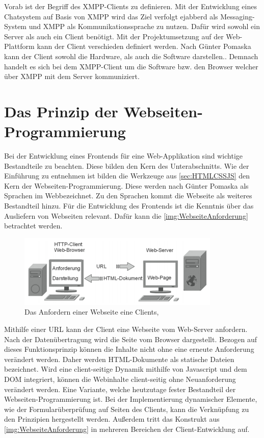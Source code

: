 \documentclass[a4paper,titlepage,halfparskip,12pt]{scrreprt}
\begin{document}
\begin{onehalfspacing}
Vorab ist der Begriff des XMPP-Clients zu definieren. Mit der Entwicklung eines Chatsystem auf Basis von XMPP wird das Ziel verfolgt ejabberd als Messaging-System und XMPP als Kommunikationssprache zu nutzen. Dafür wird sowohl ein Server als auch ein Client benötigt. Mit der Projektumsetzung auf der Web-Plattform kann der Client verschieden definiert werden. Nach Günter Pomaska kann der Client sowohl die Hardware, als auch die Software darstellen.\cite{pomaska2012webseiten}. Demnach handelt es sich bei dem XMPP-Client um die Software bzw. den Browser welcher über XMPP mit dem Server kommuniziert.

\section{Das Prinzip der Webseiten-Programmierung}
\label{WebsiteProgramming}
Bei der Entwicklung eines Frontends für eine Web-Applikation sind wichtige Bestandteile zu beachten. Diese bilden den Kern des Unterabschnitts. Wie der Einführung zu entnehmen ist bilden die Werkzeuge aus \autoref{sec:HTMLCSSJS} den Kern der Webseiten-Programmierung. Diese werden nach Günter Pomaska als \glqq Sprachen im Web\grqq bezeichnet. Zu den Sprachen kommt die Webseite als weiteres Bestandteil hinzu. Für die Entwicklung des Frontends ist die Kenntnis über das Ausliefern von Webseiten relevant. Dafür kann die \autoref{img:WebseiteAnforderung} betrachtet werden.
\begin{figure}[h]
	\centering
	\includegraphics[scale=2.1]{images/WebseiteAnfordern}
	\caption{Das Anfordern einer Webseite eine Clients, \cite{pomaska2012webseiten}}
	\label{img:WebseiteAnforderung}
\end{figure}
Mithilfe einer URL kann der Client eine Webseite vom Web-Server anfordern. Nach der Datenübertragung wird die Seite vom Browser dargestellt. Bezogen auf dieses Funktionsprinzip können die Inhalte nicht ohne eine erneute Anforderung verändert werden. Daher werden HTML-Dokumente als statische Dateien bezeichnet. Wird eine client-seitige Dynamik mithilfe von Javascript und dem \ac{DOM} integriert, können die Webinhalte client-seitig ohne Neuanforderung verändert werden. Eine Variante, welche heutzutage fester Bestandteil der Webseiten-Programmierung ist. \cite{pomaska2012webseiten}
Bei der Implementierung dynamischer Elemente, wie der Formularüberprüfung auf Seiten des Clients, kann die Verknüpfung zu den Prinzipien hergestellt werden. Außerdem tritt das Konstrukt aus \autoref{img:WebseiteAnforderung} in mehreren Bereichen der Client-Entwicklung auf.


\end{onehalfspacing}
\end{document}
